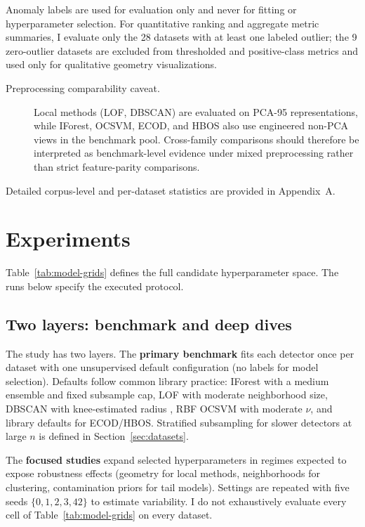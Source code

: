 \documentclass[cameraready]{Interspeech}
\begin{document}
\noindent Anomaly labels are used for evaluation only and never for fitting or hyperparameter selection. For quantitative ranking and aggregate metric summaries, I evaluate only the 28 datasets with at least one labeled outlier; the 9 zero-outlier datasets are excluded from thresholded and positive-class metrics and used only for qualitative geometry visualizations.

\begin{description}
    \item[Preprocessing comparability caveat.] Local methods (LOF, DBSCAN) are evaluated on PCA-95 representations, while IForest, OCSVM, ECOD, and HBOS also use engineered non-PCA views in the benchmark pool. Cross-family comparisons should therefore be interpreted as benchmark-level evidence under mixed preprocessing rather than strict feature-parity comparisons.
\end{description}

\noindent Detailed corpus-level and per-dataset statistics are provided in Appendix~A.

\section{Experiments}
\label{sec:experiments}

Table~\ref{tab:model-grids} defines the full candidate hyperparameter space. The runs below specify the executed protocol.

\subsection{Two layers: benchmark and deep dives}

The study has two layers. The \textbf{primary benchmark} fits each detector once per dataset with one unsupervised default configuration (no labels for model selection). Defaults follow common library practice: IForest with a medium ensemble and fixed subsample cap, LOF with moderate neighborhood size, DBSCAN with knee-estimated radius \cite{satopaa2011kneedle}, RBF OCSVM with moderate \(\nu\), and library defaults for ECOD/HBOS. Stratified subsampling for slower detectors at large \(n\) is defined in Section~\ref{sec:datasets}.

The \textbf{focused studies} expand selected hyperparameters in regimes expected to expose robustness effects (geometry for local methods, neighborhoods for clustering, contamination priors for tail models). Settings are repeated with five seeds \(\{0,1,2,3,42\}\) to estimate variability. I do not exhaustively evaluate every cell of Table~\ref{tab:model-grids} on every dataset.
\end{document}
